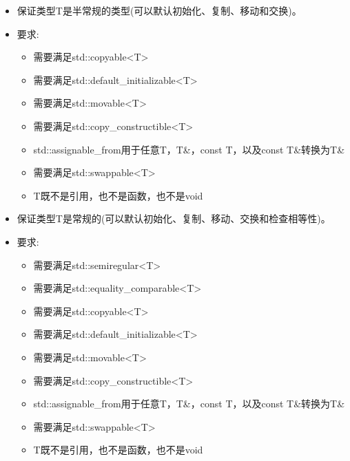 \begin{itemize}
\item
保证类型T是半常规的类型(可以默认初始化、复制、移动和交换)。

\item
要求:
\begin{itemize}
\item
需要满足std::copyable<T>

\item
需要满足std::default\_initializable<T>

\item
需要满足std::movable<T>

\item
需要满足std::copy\_constructible<T>

\item
std::assignable\_from用于任意T，T\&，const T，以及const T\&转换为T\&

\item
需要满足std::swappable<T>

\item
T既不是引用，也不是函数，也不是void
\end{itemize}
\end{itemize}


\begin{itemize}
\item
保证类型T是常规的(可以默认初始化、复制、移动、交换和检查相等性)。

\item
要求:
\begin{itemize}
\item
需要满足std::semiregular<T>

\item
需要满足std::equality\_comparable<T>

\item
需要满足std::copyable<T>

\item
需要满足std::default\_initializable<T>

\item
需要满足std::movable<T>

\item
需要满足std::copy\_constructible<T>

\item
std::assignable\_from用于任意T，T\&，const T，以及const T\&转换为T\&

\item
需要满足std::swappable<T>

\item
T既不是引用，也不是函数，也不是void
\end{itemize}
\end{itemize}

